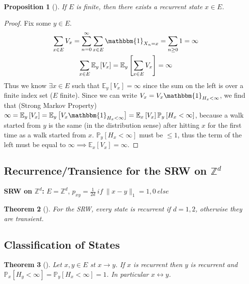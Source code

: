 \documentclass[12pt]{book}
\newtheorem{theorem}{Theorem}[section]
\newtheorem{prop}[theorem]{Proposition}
\theoremstyle{definition}
\theoremstyle{remark}
\begin{document}
\begin{prop}[]
	If $E$ is finite, then there exists a recurrent state $x \in E$.
\end{prop}
\begin{proof}
	Fix some $y \in E$.
	\begin{gather}
		\sum_{x \in E}^{} V_x = \sum_{n=0}^{\infty} \sum_{x \in E}^{} \mathbbm{1}_{X_n =x} = \sum_{n\geq 0}^{} 1  = \infty \\
	\sum_{x \in E}^{} \mathbb{E}_{y} \left[ V_x \right] = \mathbb{E}_{y} \left[ \sum_{x \in E}^{} V_x \right] = \infty \\
	\end{gather}
	Thus we know $\exists x \in E$ such that $\mathbb{E}_{y} \left[ V_x \right] = \infty$ since the sum on the left is over a finite index set ($E$ finite). Since we can write $V_x = V_x \mathbbm{1}_{H_x<\infty}$, we find that (Strong Markov Property) $\infty = \mathbb{E}_{y} \left[ V_x \right] = \mathbb{E}_{y} \left[ V_x \mathbbm{1}_{H_x<\infty}  \right] = \mathbb{E}_{x} \left[ V_x \right] \mathbb{P}_{y} \left[ H_x < \infty \right] $, because a walk started from $y$ is the same (in the distribution sense) after hitting $x$ for the first time as a walk started from $x$. $\mathbb{P}_{y} \left[ H_x < \infty \right]$ must be $ \leq 1 $, thus the term of the left must be equal to $\infty \implies \mathbb{E}_{x} \left[ V_x \right] = \infty$.
\end{proof}


\subsection{Recurrence/Transience for the SRW on $\mathbb{Z}^d$}
\textbf{SRW on $\mathbb{Z}^d$:} $E=\mathbb{Z}^d$, $p_{xy}=\frac{1}{2d}\ if\ \|x-y\|_1=1, 0\ else$ 

\begin{theorem}[]
	For the SRW, every state is recurrent if $d=1,2$, otherwise they are transient.
\end{theorem}

\subsection{Classification of States}
\begin{theorem}[]
	Let $x,y \in E$ st $x \to y$. If $x $ is recurrent then $y$ is recurrent and $\mathbb{P}_{x} \left[ H_y<\infty \right] = \mathbb{P}_{y} \left[ H_x<\infty \right]=1 $.
	In particular $x \leftrightarrow y$.
\end{theorem}
\end{document}
